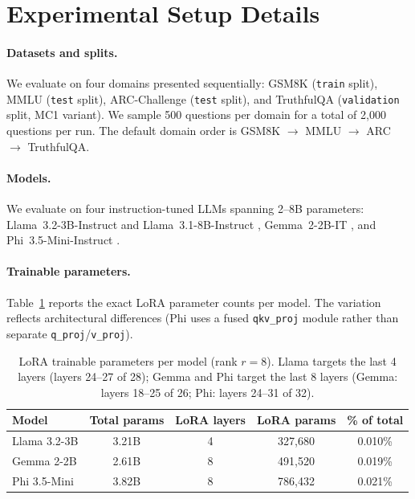 \appendix

\section{Experimental Setup Details} \label{app:setup}

\paragraph{Datasets and splits.}
We evaluate on four domains presented sequentially: 
GSM8K \citep{cobbe_training_2021} (\texttt{train} split), 
MMLU \citep{hendrycks_measuring_2021} (\texttt{test} split), 
ARC-Challenge \citep{clark_think_2018} (\texttt{test} split), 
and TruthfulQA \citep{lin_truthfulqa_2021} (\texttt{validation} split, MC1 variant).
We sample 500 questions per domain for a total of 2{,}000 questions per run.
The default domain order is GSM8K $\to$ MMLU $\to$ ARC $\to$ TruthfulQA.

\paragraph{Models.}
We evaluate on four instruction-tuned LLMs spanning 2--8B parameters:
Llama~3.2-3B-Instruct and Llama~3.1-8B-Instruct \citep{grattafiori_llama_2024},
Gemma~2-2B-IT \citep{team_gemma_2024},
and Phi~3.5-Mini-Instruct \citep{abdin_phi3_2024}.

\paragraph{Trainable parameters.}
Table~\ref{tab:lora_params} reports the exact LoRA parameter counts per model.
The variation reflects architectural differences (Phi uses a fused \texttt{qkv\_proj} 
module rather than separate \texttt{q\_proj}/\texttt{v\_proj}).

\begin{table}[h]
\centering
\caption{LoRA trainable parameters per model (rank $r{=}8$).
Llama targets the last 4 layers (layers 24--27 of 28);
Gemma and Phi target the last 8 layers 
(Gemma: layers 18--25 of 26; Phi: layers 24--31 of 32).}
\label{tab:lora_params}
\small
\begin{tabular}{@{}lcccc@{}}
\toprule
\textbf{Model} & \textbf{Total params} & \textbf{LoRA layers} & \textbf{LoRA params} & \textbf{\% of total} \\
\midrule
Llama 3.2-3B  & 3.21B & 4  & 327{,}680 & 0.010\% \\
Gemma 2-2B    & 2.61B & 8  & 491{,}520 & 0.019\% \\
Phi 3.5-Mini  & 3.82B & 8  & 786{,}432 & 0.021\% \\
\bottomrule
\end{tabular}
\end{table}


